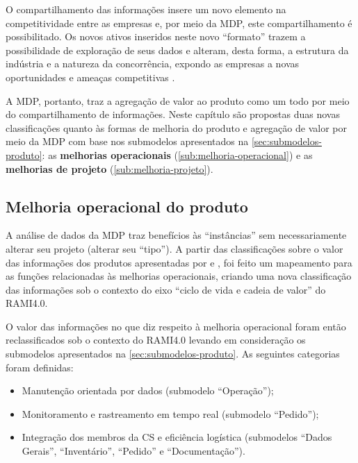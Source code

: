 O compartilhamento das informações insere um novo elemento na competitividade entre as empresas \cite{framling2013plm} e, por meio da MDP, este compartilhamento é possibilitado. Os novos ativos inseridos neste novo ``formato'' trazem a possibilidade de exploração de seus dados e alteram, desta forma, a estrutura da indústria e a natureza da concorrência, expondo as empresas a novas oportunidades e ameaças competitivas \cite{porter2015smartproducts}.

A MDP, portanto, traz a agregação de valor ao produto como um todo por meio do compartilhamento de informações. Neste capítulo são propostas duas novas classificações quanto às formas de melhoria do produto e agregação de valor por meio da MDP com base nos submodelos apresentados na \autoref{sec:submodelos-produto}: as \textbf{melhorias operacionais} (\autoref{sub:melhoria-operacional}) e as \textbf{melhorias de projeto} (\autoref{sub:melhoria-projeto}).

\subsection{Melhoria operacional do produto}
\label{sub:melhoria-operacional}

A análise de dados da MDP traz benefícios às ``instâncias'' sem necessariamente alterar seu projeto (alterar seu ``tipo''). A partir das classificações sobre o valor das informações dos produtos apresentadas por  e , foi feito um mapeamento para as funções relacionadas às melhorias operacionais, criando uma nova classificação das informações sob o contexto do eixo ``ciclo de vida e cadeia de valor'' do RAMI4.0.

O valor das informações no que diz respeito à melhoria operacional foram então reclassificados sob o contexto do RAMI4.0 levando em consideração os submodelos apresentados na \autoref{sec:submodelos-produto}. As seguintes categorias foram definidas:

\begin{itemize}
	\item Manutenção orientada por dados (submodelo ``Operação'');
	\item Monitoramento e rastreamento em tempo real (submodelo ``Pedido'');
	\item Integração dos membros da CS e eficiência logística (submodelos ``Dados Gerais'', ``Inventário'', ``Pedido'' e ``Documentação'').
\end{itemize}

